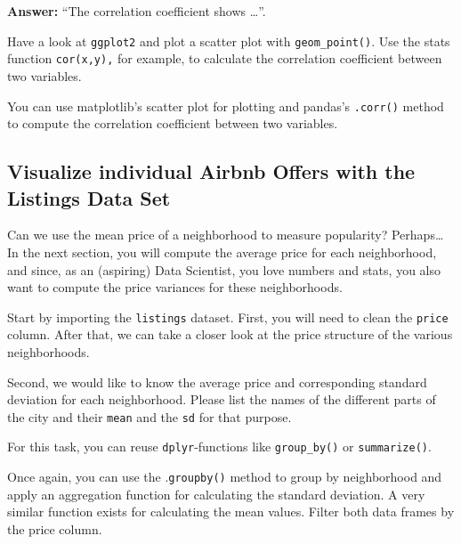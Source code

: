 \documentclass[
  11pt,
]{article}
\newenvironment{tips}[1]
  {
  \begin{itemize}
  \footnotesize
  \renewcommand{\labelitemi}{
    \raisebox{-.7\height}[0pt][0pt]{
      {\setkeys{Gin}{width=3em,keepaspectratio}
        \texttt{[image: images/\#1.png]}}
    }
  }
  \setlength{\fboxsep}{1em}
  \begin{rbox}
  \item
  }
  {
  \end{rbox}
  \end{itemize}
  }
\newenvironment{tipsp}[1]
  {
  \begin{itemize}
  \footnotesize
  \renewcommand{\labelitemi}{
    \raisebox{-.7\height}[0pt][0pt]{
      {\setkeys{Gin}{width=3em,keepaspectratio}
        \texttt{[image: images/\#1.png]}}
    }
  }
  \setlength{\fboxsep}{1em}
  \begin{pbox}
  \item
  }
  {
  \end{pbox}
  \end{itemize}
  }
\begin{document}
\textbf{Answer:} ``The correlation coefficient shows \ldots{}''.

\begin{tips}r
Have a look at \texttt{ggplot2} and plot a scatter plot with \texttt{geom\_point()}.
Use the stats function \texttt{cor(x,y),} for example, to calculate the correlation coefficient between two variables.

\end{tips}

\begin{tipsp}p
You can use matplotlib's scatter plot for plotting and pandas's \texttt{.corr()} method to compute the correlation coefficient between two variables.

\end{tipsp}

\hypertarget{visualize-individual-airbnb-offers-with-the-listings-data-set}{%
\subsection{Visualize individual Airbnb Offers with the Listings Data Set}\label{visualize-individual-airbnb-offers-with-the-listings-data-set}}

Can we use the mean price of a neighborhood to measure popularity?
Perhaps\ldots{} In the next section, you will compute the average price for each neighborhood, and since, as an (aspiring) Data Scientist, you love numbers and stats, you also want to compute the price variances for these neighborhoods.

Start by importing the \texttt{listings} dataset.
First, you will need to clean the \texttt{price} column.
After that, we can take a closer look at the price structure of the various neighborhoods.

Second, we would like to know the average price and corresponding standard deviation for each neighborhood.
Please list the names of the different parts of the city and their \texttt{mean} and the \texttt{sd} for that purpose.

\begin{tips}r
For this task, you can reuse \texttt{dplyr}-functions like \texttt{group\_by()} or \texttt{summarize()}.

\end{tips}

\begin{tipsp}p
Once again, you can use the .\texttt{groupby()} method to group by neighborhood and apply an aggregation function for calculating the standard deviation.
A very similar function exists for calculating the mean values.
Filter both data frames by the price column.

\end{tipsp}
\end{document}
